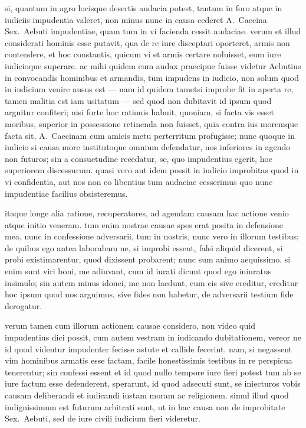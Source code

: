

 si, quantum in agro locisque desertis audacia potest, tantum in foro atque in iudiciis impudentia valeret, non minus nunc in causa cederet A.~Caecina Sex.~Aebuti impudentiae, quam tum in vi facienda cessit audaciae. verum et illud considerati hominis esse putavit, qua de re iure disceptari oporteret, armis non contendere, et hoc constantis, quicum vi et armis certare noluisset, eum iure iudicioque superare. 
 ac mihi quidem cum audax praecipue fuisse videtur Aebutius in convocandis hominibus et armandis, tum impudens in iudicio, non solum quod in iudicium venire ausus est — nam id quidem tametsi improbe fit in aperta re, tamen malitia est iam usitatum — sed quod non dubitavit id ipsum quod arguitur confiteri; nisi forte hoc rationis habuit, quoniam, si facta vis esset moribus, superior in possessione retinenda non fuisset, quia contra ius moremque facta sit, A.~Caecinam cum amicis metu perterritum profugisse; nunc quoque in iudicio si causa more institutoque omnium defendatur, nos inferiores in agendo non futuros; sin a consuetudine recedatur, se, quo impudentius egerit, hoc superiorem discessurum. quasi vero aut idem possit in iudicio improbitas quod in vi confidentia, aut nos non eo libentius tum audaciae cesserimus quo nunc impudentiae facilius obsisteremus.

 itaque longe alia ratione, recuperatores, ad agendam causam hac actione venio atque initio veneram. tum enim nostrae causae spes erat posita in defensione mea, nunc in confessione adversarii, tum in nostris, nunc vero in illorum testibus; de quibus ego antea laborabam ne, si improbi essent, falsi aliquid dicerent, si probi existimarentur, quod dixissent probarent; nunc sum animo aequissimo. si enim sunt viri boni, me adiuvant, cum id iurati dicunt quod ego iniuratus insimulo; sin autem minus idonei, me non laedunt, cum eis sive creditur, creditur hoc ipsum quod nos arguimus, sive fides non habetur, de adversarii testium fide derogatur.

 verum tamen cum illorum actionem causae considero, non video quid impudentius dici possit, cum autem vestram in iudicando dubitationem, vereor ne id quod videntur impudenter fecisse astute et callide fecerint. nam, si negassent vim hominibus armatis esse factam, facile honestissimis testibus in re perspicua tenerentur; sin confessi essent et id quod nullo tempore iure fieri potest tum ab se iure factum esse defenderent, sperarunt, id quod adsecuti sunt, se iniecturos vobis causam deliberandi et iudicandi iustam moram ac religionem. simul illud quod indignissimum est futurum arbitrati sunt, ut in hac causa non de improbitate Sex.~Aebuti, sed de iure civili iudicium fieri videretur.

